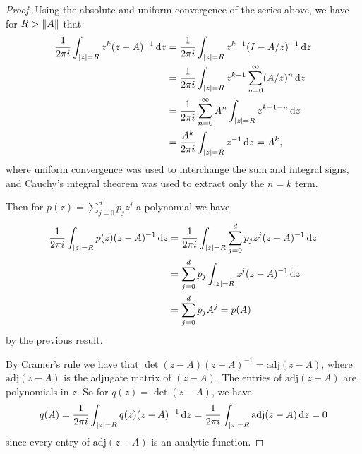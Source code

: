 \documentclass[12pt]{amsart}
\begin{document}
\begin{proof}
\baselineskip=24pt
Using the absolute and uniform convergence of the series above, we have for $R>\norm{A}$ that \begin{align*}
  \frac{1}{2\pi i}\int_{\abs{z}=R}z^k (z-A)^{-1}\dd{z} &= \frac{1}{2\pi i}\int_{\abs{z}=R}z^{k-1} (I-A/z)^{-1}\dd{z} \\
  &= \frac{1}{2\pi i}\int_{\abs{z}=R}z^{k-1} \sum_{n=0}^\infty (A/z)^n \dd{z} \\
  &= \frac{1}{2\pi i}\sum_{n=0}^\infty A^n\int_{\abs{z}=R}z^{k-1-n}\dd{z}\\
  &= \frac{A^k}{2\pi i}\int_{\abs{z}=R}z^{-1}\dd{z} = A^k,
\end{align*} where uniform convergence was used to interchange the sum and integral signs, and Cauchy's integral theorem was used to extract only the $n=k$ term.

Then for $p(z)=\sum_{j=0}^d p_jz^j$ a polynomial we have \begin{align*}
  \frac{1}{2\pi i} \int_{\abs{z}=R} p(z)(z-A)^{-1} \dd{z} &= \frac{1}{2\pi i} \int_{\abs{z}=R} \sum_{j=0}^d p_jz^j(z-A)^{-1} \dd{z}\\
  &= \sum_{j=0}^d p_j\int_{\abs{z} = R} z^j(z-A)^{-1} \dd{z}\\
  &= \sum_{j=0}^d p_jA^j = p(A)
\end{align*} by the previous result.

By Cramer's rule we have that $\det(z-A)(z-A)^{-1} = \mathrm{adj}(z-A)$, where $\mathrm{adj}(z-A)$ is the adjugate matrix of $(z-A)$. The entries of $\mathrm{adj}(z-A)$ are polynomials in $z$. So for $q(z) = \det(z-A)$, we have \[q(A) = \frac{1}{2\pi i} \int_{\abs{z}=R} q(z)(z-A)^{-1} \dd{z} = \frac{1}{2\pi i} \int_{\abs{z}=R} \mathrm{adj}(z-A) \dd{z} = 0\] since every entry of $\mathrm{adj}(z-A)$ is an analytic function. 
\end{proof}
\end{document}
